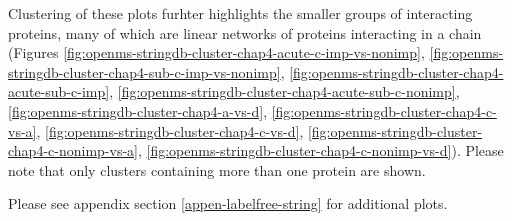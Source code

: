 \documentclass[9pt,lineno]{elife}
\begin{document}
Clustering of these plots furhter highlights the smaller groups of interacting proteins, many of which are linear networks of proteins interacting in a chain (Figures \ref{fig:openms-stringdb-cluster-chap4-acute-c-imp-vs-nonimp}, \ref{fig:openms-stringdb-cluster-chap4-sub-c-imp-vs-nonimp}, \ref{fig:openms-stringdb-cluster-chap4-acute-sub-c-imp}, \ref{fig:openms-stringdb-cluster-chap4-acute-sub-c-nonimp}, \ref{fig:openms-stringdb-cluster-chap4-a-vs-d}, \ref{fig:openms-stringdb-cluster-chap4-c-vs-a}, \ref{fig:openms-stringdb-cluster-chap4-c-vs-d}, \ref{fig:openms-stringdb-cluster-chap4-c-nonimp-vs-a}, \ref{fig:openms-stringdb-cluster-chap4-c-nonimp-vs-d}).
Please note that only clusters containing more than one protein are shown.

Please see appendix section \ref{appen-labelfree-string} for additional plots.
\end{document}
